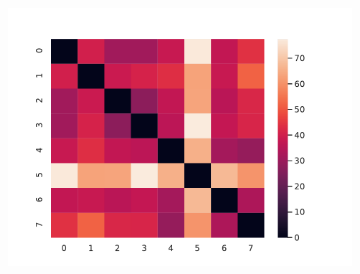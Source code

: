 \documentclass[10pt]{beamer}
\begin{document}
\begin{frame}[fragile]{}
\begin{figure}[ht]
\begin{subfigure}{.32 \linewidth}
    \includegraphics[scale=0.2]{persistence_diagrams/distances/heatmaps/bottleneck_h2.npy.pdf}
  \end{subfigure}


\end{figure}
\end{frame}
\end{document}
